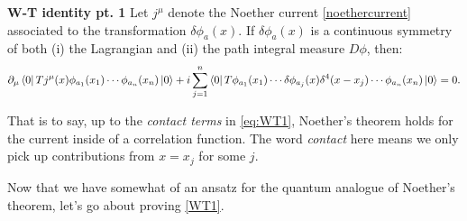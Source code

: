 \documentclass[main.tex]{subfiles}
\begin{document}
\begin{thm} \label{thm:WT1}\textbf{W-T identity pt. 1}
Let $j^\mu$ denote the Noether current \ref{noethercurrent} associated to the transformation $\delta \phi_a (x)$. If $\delta \phi_a (x)$ is a continuous symmetry of both (i) the Lagrangian and (ii) the path integral measure $D\phi$, then:
\begin{equation} \label{eq:WT1}
\partial_\mu \bra{0} T j^\mu (x) \phi_{a_1} (x_1) \cdots \phi_{a_n} (x_n) \ket{0} + i \sum_{j=1}^n \bra{0} T \phi_{a_1} (x_1) \cdots \delta \phi_{a_j} (x) \delta^4 (x-x_j) \cdots \phi_{a_n} (x_n) \ket{0} = 0.
\end{equation}
\end{thm}
That is to say, up to the \textit{contact terms} in \ref{eq:WT1}, Noether's theorem holds for the current inside of a correlation function. The word \textit{contact} here means we only pick up contributions from $x = x_j$ for some $j$.

Now that we have somewhat of an ansatz for the quantum analogue of Noether's theorem, let's go about proving \ref{WT1}.
\end{document}
